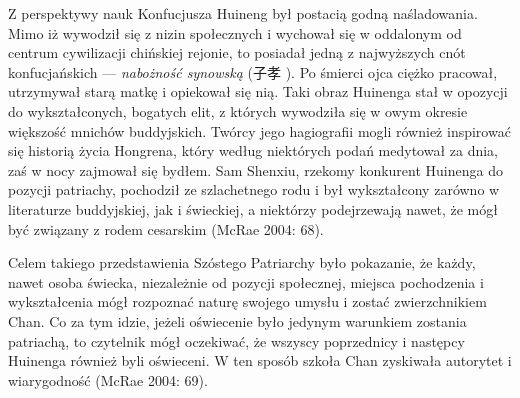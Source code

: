 Z perspektywy nauk Konfucjusza Huineng był postacią godną naśladowania.
Mimo iż wywodził się z nizin społecznych i wychował się w oddalonym od centrum cywilizacji chińskiej rejonie, to posiadał jedną z najwyższych cnót konfucjańskich --- \textit{nabożność synowską} (子孝 ).
Po śmierci ojca ciężko pracował, utrzymywał starą matkę i opiekował się nią.
Taki obraz Huinenga stał w opozycji do wykształconych, bogatych elit, z których wywodziła się w owym okresie większość mnichów buddyjskich.
Twórcy jego hagiografii mogli również inspirować się historią życia Hongrena, który według niektórych podań medytował za dnia, zaś w nocy zajmował się bydłem.
Sam Shenxiu, rzekomy konkurent Huinenga do pozycji patriachy, pochodził ze szlachetnego rodu i był wykształcony zarówno w literaturze buddyjskiej, jak i świeckiej, a niektórzy podejrzewają nawet, że mógł być związany z rodem cesarskim
(McRae 2004: 68).

Celem takiego przedstawienia Szóstego Patriarchy było pokazanie, że każdy, nawet osoba świecka, niezależnie od pozycji społecznej, miejsca pochodzenia i wykształcenia mógł rozpoznać naturę swojego umysłu i zostać zwierzchnikiem Chan.
Co za tym idzie, jeżeli oświecenie było jedynym warunkiem zostania patriachą, to czytelnik mógł oczekiwać, że wszyscy poprzednicy i następcy Huinenga również byli oświeceni.
W ten sposób szkoła Chan zyskiwała autorytet i wiarygodność
(McRae 2004: 69).
